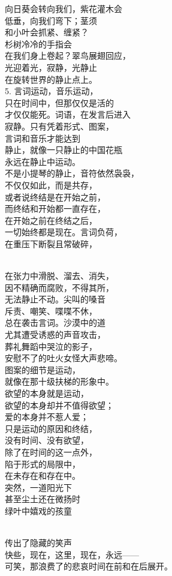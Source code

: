 \documentclass{article}
\begin{document}
向日葵会转向我们，紫花灌木会\\
低垂，向我们弯下；茎须\\
和小叶会抓紧、缠紧？\\
杉树冷冷的手指会\\
在我们身上卷起？翠鸟展翅回应，\\
光迎着光，寂静，光静止\\
在旋转世界的静止点上。\\
5. 言词运动，音乐运动，\\
只在时间中，但那仅仅是活的\\
才仅仅能死。词语，在发言后进入\\
寂静。只有凭着形式、图案，\\
言词和音乐才能达到\\
静止，就像一只静止的中国花瓶\\
永远在静止中运动。\\
不是小提琴的静止，音符依然袅袅，\\
不仅仅如此，而是共存，\\
或者说终结是在开始之前，\\
而终结和开始都一直存在，\\
在开始之前在终结之后，\\
一切始终都是现在。言词负荷，\\
在重压下断裂且常破碎， \par \newpage  \par 
\\
在张力中滑脱、溜去、消失，\\
因不精确而腐败，不得其所，\\
无法静止不动。尖叫的嗓音\\
斥责、嘲笑、喋喋不休，\\
总在袭击言词。沙漠中的道\\
尤其遭受诱惑的声音攻击，\\
葬礼舞蹈中哭泣的影子，\\
安慰不了的吐火女怪大声悲啼。\\
图案的细节是运动，\\
就像在那十级扶梯的形象中。\\
欲望的本身就是运动，\\
欲望的本身却并不值得欲望；\\
爱的本身并不惹人爱；\\
只是运动的原因和终结，\\
没有时间、没有欲望，\\
除了在时间的这一点外，\\
陷于形式的局限中，\\
在未存在和存在中。\\
突然，一道阳光下\\
甚至尘土还在微扬时\\
绿叶中嬉戏的孩童 \par \newpage  \par 
\\
传出了隐藏的笑声\\
快些，现在，这里，现在，永远——\\
可笑，那浪费了的悲哀时间在前和在后展开。
\end{document}

